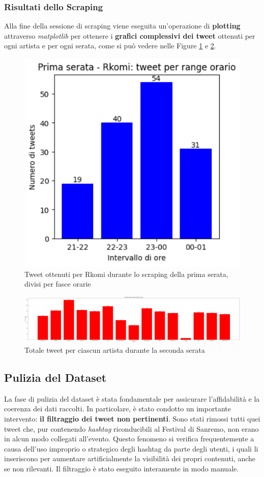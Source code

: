 \documentclass[a4paper,12pt]{article}
\begin{document}
\subsubsection{Risultati dello Scraping}
Alla fine della sessione di scraping viene eseguita un'operazione di \textbf{plotting} attraverso \textit{matplotlib} per ottenere i \textbf{grafici complessivi dei tweet} ottenuti per ogni artista e per ogni serata, come si può vedere nelle Figure \ref{fig:totale_tweet_rkomi_prima_serata_fasce_orarie} e \ref{fig:totale_tweet_seconda_serata}.
\begin{figure}[htbp]
    \centering
    \includegraphics[width=0.5\linewidth]{media/tweet_scraped_rkomi.png}
    \caption{Tweet ottenuti per Rkomi durante lo scraping della prima serata, divisi per fasce orarie}
    \label{fig:totale_tweet_rkomi_prima_serata_fasce_orarie}
\end{figure}

\begin{figure}[htbp]
    \centering
    \includegraphics[width=\linewidth]{media/foto_rossa.png}
    \caption{Totale tweet per ciascun artista durante la seconda serata}
    \label{fig:totale_tweet_seconda_serata}
\end{figure}

\subsection{Pulizia del Dataset}
La fase di pulizia del dataset è stata fondamentale per assicurare l'affidabilità e la coerenza dei dati raccolti. In particolare, è stato condotto un importante intervento: \textbf{il filtraggio dei tweet non pertinenti}. Sono stati rimossi tutti quei tweet che, pur contenendo \textit{hashtag} riconducibili al Festival di Sanremo, non erano in alcun modo collegati all’evento. Questo fenomeno si verifica frequentemente a causa dell’uso improprio o strategico degli hashtag da parte degli utenti, i quali li inseriscono per aumentare artificialmente la visibilità dei propri contenuti, anche se non rilevanti. Il filtraggio è stato eseguito interamente in modo manuale.
\end{document}
